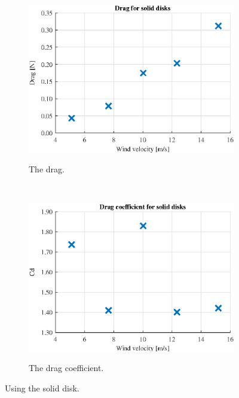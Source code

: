 \begin{figure} [h!]
    \centering
    \begin{subfigure}[b]{0.45\linewidth}
        \includegraphics[width=\textwidth]{0_Images/SolidDrag.eps}
        \label{Fig:SolidDrag}
        \caption{The drag.}
    \end{subfigure}
    ~
    \begin{subfigure}[b]{0.45\linewidth}
        \includegraphics[width=\textwidth]{0_Images/SolidCD.eps}
        \label{Fig:SolidCD}
        \caption{The drag coefficient.}
    \end{subfigure}
    \caption{Using the solid disk.}
    \label{fig:SolidDisk}
\end{figure}

